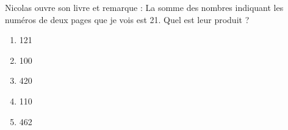 Nicolas ouvre son livre et remarque : \og La somme des nombres indiquant les numéros de deux pages que je vois est 21\fg. Quel est leur produit ?
\begin{multicols}{5}
  \begin{enumerate}[A/]
  \item 121
  \item 100
  \item 420
  \item 110
  \item 462
  \end{enumerate}
\end{multicols}